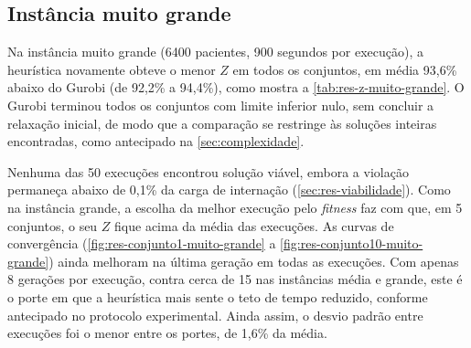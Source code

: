 \subsection{Instância muito grande}
\label{sec:res-muito-grande}

Na instância muito grande (6400 pacientes, 900 segundos por execução), a heurística novamente obteve o menor $Z$ em todos os conjuntos, em média 93,6\% abaixo do Gurobi (de 92,2\% a 94,4\%), como mostra a \autoref{tab:res-z-muito-grande}. O Gurobi terminou todos os conjuntos com limite inferior nulo, sem concluir a relaxação inicial, de modo que a comparação se restringe às soluções inteiras encontradas, como antecipado na \autoref{sec:complexidade}.

Nenhuma das 50 execuções encontrou solução viável, embora a violação permaneça abaixo de 0,1\% da carga de internação (\autoref{sec:res-viabilidade}). Como na instância grande, a escolha da melhor execução pelo \textit{fitness} faz com que, em 5 conjuntos, o seu $Z$ fique acima da média das execuções. As curvas de convergência (\autoref{fig:res-conjunto1-muito-grande} a \autoref{fig:res-conjunto10-muito-grande}) ainda melhoram na última geração em todas as execuções. Com apenas 8 gerações por execução, contra cerca de 15 nas instâncias média e grande, este é o porte em que a heurística mais sente o teto de tempo reduzido, conforme antecipado no protocolo experimental. Ainda assim, o desvio padrão entre execuções foi o menor entre os portes, de 1,6\% da média.

